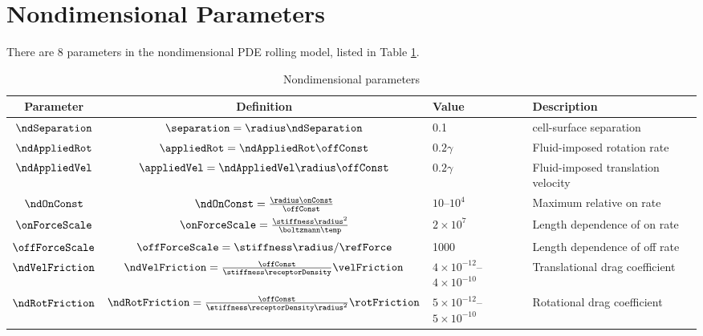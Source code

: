 \section{Nondimensional Parameters}
\label{sec:nd-params}

There are 8 parameters in the nondimensional PDE rolling model, listed
in Table \ref{tab:nd-params}.

\begin{table}
  \centering
  \begin{tabular}{c|c|l|l}
    Parameter & Definition & Value & Description \\ \hline
    $\ndSeparation$ & $\separation = \radius\ndSeparation$ & 0.1
                                   & cell-surface separation \\
    $\ndAppliedRot$ & $\appliedRot = \ndAppliedRot\offConst$
                           & $0.2\gamma$ & Fluid-imposed rotation rate
    \\
    $\ndAppliedVel$ & $\appliedVel = \ndAppliedVel\radius\offConst$
                           & $0.2\gamma$ & Fluid-imposed translation
                                           velocity \\
    $\ndOnConst$ & $\ndOnConst = \frac{\radius\onConst}{\offConst}$
                           & $10$--$10^4$ & Maximum relative on rate \\
    $\onForceScale$ & $\onForceScale =
                    \frac{\stiffness\radius^2}{\boltzmann\temp}$
                           & $2 \times 10^7$ & Length dependence of on
                                               rate \\
    $\offForceScale$ & $\offForceScale = \stiffness\radius/\refForce$
                           & 1000 & Length dependence of off rate \\
    $\ndVelFriction$ & $\ndVelFriction =
                     \frac{\offConst}{\stiffness\receptorDensity}
                     \velFriction$ & $4 \times 10^{-12}$--$4 \times
                                     10^{-10}$
                                   & Translational drag coefficient \\
    $\ndRotFriction$ & $\ndRotFriction =
                     \frac{\offConst}{\stiffness\receptorDensity
                                      \radius^2}\rotFriction$
                           & $5 \times 10^{-12}$--$5 \times 10^{-10}$
                                   & Rotational drag coefficient
  \end{tabular}
  \caption{Nondimensional parameters}
  \label{tab:nd-params}
\end{table}
